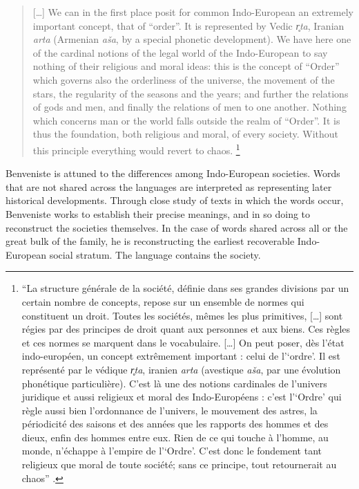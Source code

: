 \documentclass[output=paper]{langscibook}
\begin{document}
\begin{quotation}
[…] We can in the first place posit for common Indo-European an extremely important concept, that of ``order''. It is represented by Vedic \emph{r̥ta}, Iranian \emph{arta} (Armenian \emph{aša}, by a special phonetic development). We have here one of the cardinal notions of the legal world of the Indo-European to say nothing of their religious and moral ideas: this is the concept of ``Order'' which governs also the orderliness of the universe, the movement of the stars, the regularity of the seasons and the years; and further the relations of gods and men, and finally the relations of men to one another. Nothing which concerns man or the world falls outside the realm of ``Order''. It is thus the foundation, both religious and moral, of every society. Without this principle everything would revert to chaos. \citep[379--380]{Benveniste20161973}\footnote{``La structure générale de la société, définie dans ses grandes divisions par un certain nombre de concepts, repose sur un ensemble de normes qui constituent un droit. Toutes les sociétés, mêmes les plus primitives, […] sont régies par des principes de droit quant aux personnes et aux biens. Ces règles et ces normes se marquent dans le vocabulaire. […] On peut poser, dès l'état indo-européen, un concept extrêmement important : celui de l'`ordre'. Il est représenté par le védique \emph{r̥ta}, iranien \emph{arta} (avestique \emph{aša}, par une évolution phonétique particulière). C'est là une des notions cardinales de l'univers juridique et aussi religieux et moral des Indo-Européens : c'est l'`Ordre' qui règle aussi bien l'ordonnance de l'univers, le mouvement des astres, la périodicité des saisons et des années que les rapports des hommes et des dieux, enfin des hommes entre eux. Rien de ce qui touche à l'homme, au monde, n'échappe à l'empire de l'`Ordre'. C'est donc le fondement tant religieux que moral de toute société; sans ce principe, tout retournerait au chaos'' \citep[vol. 2, 99--100]{Benveniste1969vocabulaire}.}
\end{quotation}

Benveniste is attuned to the differences among Indo-European societies. Words that are not shared across the languages are interpreted as representing later historical developments. Through close study of texts in which the words occur, Benveniste works to establish their precise meanings, and in so doing to reconstruct the societies themselves. In the case of words shared across all or the great bulk of the family, he is reconstructing the earliest recoverable Indo-European social stratum. The language contains the society.
\end{document}
